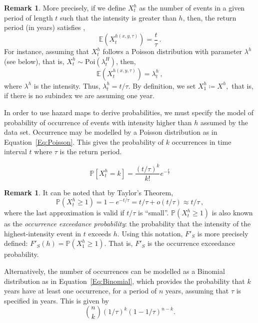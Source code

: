 \documentclass[a4paper,11pt]{extarticle} %
\theoremstyle{definition}
\newtheorem{remarkx}[theorem]{Remark}
\newenvironment{remark}
{\pushQED{\qed}\renewcommand{\qedsymbol}{$\diamond$}\begin{remarkx}}
    {\popQED\end{remarkx}}
\begin{document}
\begin{remark}
    More precisely, if we define $X^h_t$ as the number of events in a given period of length $t$ such that the intensity is greater than $h$, then, the return period (in years) satisfies \cite{RaschkeEtAl:2022},
    \begin{equation}\label{Eq:ReturnPeriodDef}
        \mathbb{E}\left( X_t^{h(x,y, \tau)}\right)=\frac{t}{\tau}\,.
    \end{equation}
For instance, assuming that $X_t^h$ follows a Poisson distribution with parameter $\lambda^h$ (see below), that is, $X_t^h\sim\text{Poi}\left(\lambda^H_t\right)$, then,
$$
\mathbb{E}\left( X_t^{h(x,y, \tau)}\right)=\lambda^h_t\,,
$$
where $\lambda^h$ is the intensity. Thus, $\lambda^h_t = t/\tau .$ By definition, we set  $X_1^h\coloneqq X^h,$ that is, if there is no subindex we are assuming one year.
\end{remark}

In order to use hazard maps to derive probabilities, we must specify the model of probability of occurrence of events with intensity higher than $h$ assumed by the data set. Occurrence may be modelled by a Poisson distribution as in Equation~\ref{Eq:Poisson}. This gives the probability of $k$ occurrences in time interval $t$ where $\tau$ is the return period.

\begin{equation}
\label{Eq:Poisson}
\mathbb{P}[{X^h_t} = k] = \frac{(t / \tau)^k}{k!}  e^{-\frac{t}{\tau}}
\end{equation}


\begin{remark}
    It can be noted that by Taylor's Theorem,
\begin{equation}\label{Eq:PoissonApprox}
        \mathbb{P}(X_t^h\ge1)=1-e^{-t/\tau}=t/\tau+o\left(t/\tau\right)\approx t/\tau\,,
\end{equation}
    where the last approximation is valid if $t/\tau$ is ``small''. $\mathbb{P}(X_t^h\ge1)$ is also known as the \emph{occurrence exceedance probability}: the probability that the intensity of the highest-intensity event in $t$ exceeds $h$. Using this notation, $F'_S$ is more precisely defined: $F'_S(h) = \mathbb{P}(X_1^h\ge1)$. That is, $F'_S$ is the occurrence exceedance probability.
\end{remark}

Alternatively, the number of occurrences can be modelled as a Binomial distribution as in Equation~\ref{Eq:Binomial}, which provides the probability that $k$ years have at least one occurrence, for a period of $n$ years, assuming that $\tau$ is specified in years. This is given by
\begin{equation}
    \label{Eq:Binomial}
    \binom{n}{k} (1/\tau)^k (1-1/\tau)^{n - k}.
\end{equation}
\end{document}
